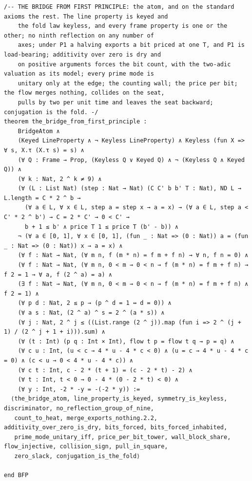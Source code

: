 \documentclass[10pt,twocolumn]{article}
\begin{document}
\begin{Verbatim}
/-- THE BRIDGE FROM FIRST PRINCIPLE: the atom, and on the standard axioms the rest. The line property is keyed and
    the fold law keyless, and every frame property is one or the other; no ninth reflection on any number of
    axes; under P1 a halving exports a bit priced at one T, and P1 is load-bearing; additivity over zero is dry and
    on positive arguments forces the bit count, with the two-adic valuation as its model; every prime mode is
    unitary only at the edge; the counting wall; the price per bit; the flow merges nothing, collides on the seat,
    pulls by two per unit time and leaves the seat backward; conjugation is the fold. -/
theorem the_bridge_from_first_principle :
    BridgeAtom ∧
    (Keyed LineProperty ∧ ¬ Keyless LineProperty) ∧ Keyless (fun X => ∀ s, X.τ (X.τ s) = s) ∧
    (∀ Q : Frame → Prop, (Keyless Q ∨ Keyed Q) ∧ ¬ (Keyless Q ∧ Keyed Q)) ∧
    (∀ k : Nat, 2 ^ k ≠ 9) ∧
    (∀ (L : List Nat) (step : Nat → Nat) (C C' b b' T : Nat), ND L → L.length = C * 2 ^ b →
      (∀ a ∈ L, ∀ x ∈ L, step a = step x → a = x) → (∀ a ∈ L, step a < C' * 2 ^ b') → C = 2 * C' → 0 < C' →
      b + 1 ≤ b' ∧ price T 1 ≤ price T (b' - b)) ∧
    ¬ (∀ a ∈ [0, 1], ∀ x ∈ [0, 1], (fun _ : Nat => (0 : Nat)) a = (fun _ : Nat => (0 : Nat)) x → a = x) ∧
    (∀ f : Nat → Nat, (∀ m n, f (m * n) = f m + f n) → ∀ n, f n = 0) ∧
    (∀ f : Nat → Nat, (∀ m n, 0 < m → 0 < n → f (m * n) = f m + f n) → f 2 = 1 → ∀ a, f (2 ^ a) = a) ∧
    (∃ f : Nat → Nat, (∀ m n, 0 < m → 0 < n → f (m * n) = f m + f n) ∧ f 2 = 1) ∧
    (∀ p d : Nat, 2 ≤ p → (p ^ d = 1 ↔ d = 0)) ∧
    (∀ a s : Nat, (2 ^ a) ^ s = 2 ^ (a * s)) ∧
    (∀ j : Nat, 2 ^ j ≤ ((List.range (2 ^ j)).map (fun i => 2 ^ (j + 1) / (2 ^ j + 1 + i))).sum) ∧
    (∀ (t : Int) (p q : Int × Int), flow t p = flow t q → p = q) ∧
    (∀ c u : Int, (u < c → 4 * u - 4 * c < 0) ∧ (u = c → 4 * u - 4 * c = 0) ∧ (c < u → 0 < 4 * u - 4 * c)) ∧
    (∀ c t : Int, c - 2 * (t + 1) = (c - 2 * t) - 2) ∧
    (∀ t : Int, t < 0 → 0 - 4 * (0 - 2 * t) < 0) ∧
    (∀ y : Int, -2 * -y = -(-2 * y)) :=
  ⟨the_bridge_atom, line_property_is_keyed, symmetry_is_keyless, discriminator, no_reflection_group_of_nine,
   count_to_heat, merge_exports_nothing.2.2, additivity_over_zero_is_dry, bits_forced, bits_forced_inhabited,
   prime_mode_unitary_iff, price_per_bit_tower, wall_block_share, flow_injective, collision_sign, pull_in_square,
   zero_slack, conjugation_is_the_fold⟩

end BFP


\end{Verbatim}
\end{document}
